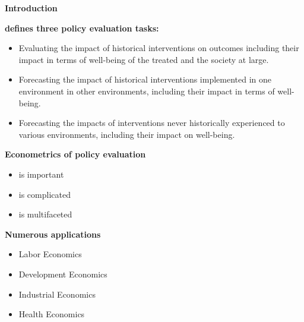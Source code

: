 \begin{frame}\begin{center}
	\LARGE\textbf{Introduction}
\end{center}\end{frame}
\begin{frame}
	\textbf{\cite{Heckman.2008} defines three policy evaluation tasks:}
	\begin{itemize}\setlength\itemsep{1em}
		\item Evaluating the impact of historical interventions on outcomes including their impact in terms of well-being of the treated and the society at large.
		\item Forecasting the impact of historical interventions implemented in one environment in other environments, including their impact in terms of well-being.
		\item Forecasting the impacts of interventions never historically experienced to various environments, including their impact on well-being.
	\end{itemize}
\end{frame}
\begin{frame}
	\textbf{Econometrics of policy evaluation}\\\vspace{0.3cm}
	\begin{itemize}\setlength\itemsep{1em}
		\item is important
		\item is complicated
		\item is multifaceted
	\end{itemize}
\end{frame}
\begin{frame}
\textbf{Numerous applications}\\\vspace{0.3cm}

	\begin{itemize}\setlength\itemsep{1em}
		\item Labor Economics
		\item Development Economics
		\item Industrial Economics
		\item Health Economics
	\end{itemize}
\end{frame}
